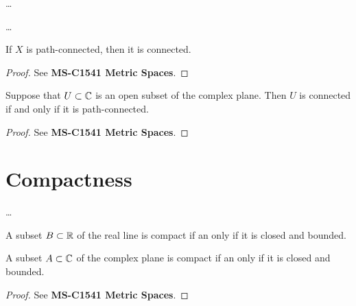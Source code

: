 \begin{definition}[Connectedness]
  \label{def:connected}
  \ldots
\end{definition}

\begin{definition}
  \label{def:path_connected}
  \ldots
\end{definition}

\begin{lemma}
  \label{lem:path_connected_implies_connected}
  If $X$ is path-connected, then it is connected.
\end{lemma}
\begin{proof}
  See \textbf{MS-C1541 Metric Spaces}.
\end{proof}

\begin{lemma}
  \label{lem:open_connected_iff_path_connected}
  Suppose that $U \subset \mathbb{C}$ is an open subset of the complex plane.
  Then $U$ is connected if and only if it is path-connected.
\end{lemma}
\begin{proof}
  See \textbf{MS-C1541 Metric Spaces}.
\end{proof}

\section{Compactness}

\begin{definition}[Compactness]
  \label{def:compact}
  \ldots
\end{definition}

\begin{theorem}
  \label{thm:bolzano_weierstrass}
  A subset $B \subset \mathbb{R}$ of the real line is compact
  if an only if it is closed and bounded.

  A subset $A \subset \mathbb{C}$ of the complex plane is compact
  if an only if it is closed and bounded.
\end{theorem}
\begin{proof}
  See \textbf{MS-C1541 Metric Spaces}.
\end{proof}


